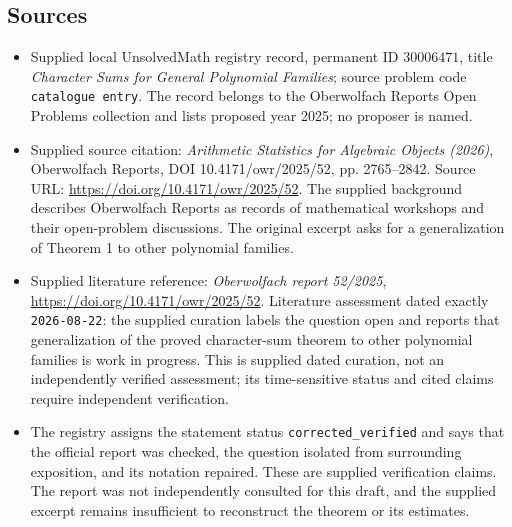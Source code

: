 \documentclass[11pt]{article}
\begin{document}
\subsection{Sources}
\begin{itemize}
\item Supplied local UnsolvedMath registry record, permanent ID \(30006471\), title \emph{Character Sums for General Polynomial Families}; source problem code \texttt{catalogue entry}. The record belongs to the Oberwolfach Reports Open Problems collection and lists proposed year 2025; no proposer is named.
\item Supplied source citation: \emph{Arithmetic Statistics for Algebraic Objects (2026)}, Oberwolfach Reports, DOI 10.4171/owr/2025/52, pp. 2765--2842. Source URL: \url{https://doi.org/10.4171/owr/2025/52}. The supplied background describes Oberwolfach Reports as records of mathematical workshops and their open-problem discussions. The original excerpt asks for a generalization of Theorem 1 to other polynomial families.
\item Supplied literature reference: \emph{Oberwolfach report 52/2025}, \url{https://doi.org/10.4171/owr/2025/52}. Literature assessment dated exactly \texttt{2026-08-22}: the supplied curation labels the question open and reports that generalization of the proved character-sum theorem to other polynomial families is work in progress. This is supplied dated curation, not an independently verified assessment; its time-sensitive status and cited claims require independent verification.
\item The registry assigns the statement status \texttt{corrected\_verified} and says that the official report was checked, the question isolated from surrounding exposition, and its notation repaired. These are supplied verification claims. The report was not independently consulted for this draft, and the supplied excerpt remains insufficient to reconstruct the theorem or its estimates.
\end{itemize}
\end{document}
